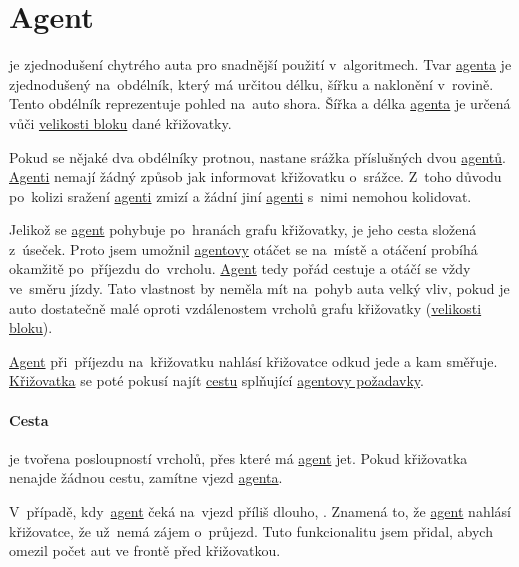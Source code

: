 \section{Agent}\label{sec:agent}



 je zjednodušení chytrého auta pro snadnější použití v~algoritmech.
Tvar \hyperref[sec:agent]{agenta} je zjednodušený na~obdélník, který má určitou délku, šířku a naklonění v~rovině.
Tento obdélník reprezentuje pohled na~auto shora.
Šířka a délka \hyperref[sec:agent]{agenta} je určená vůči \hyperref[par:velikost_bloku]{velikosti bloku} dané křižovatky.

Pokud se nějaké dva obdélníky protnou, nastane srážka příslušných dvou \hyperref[sec:agent]{agentů}.
\hyperref[sec:agent]{Agenti} nemají žádný způsob jak informovat křižovatku o~srážce.
Z~toho důvodu po~kolizi sražení \hyperref[sec:agent]{agenti} zmizí a žádní jiní \hyperref[sec:agent]{agenti} s~nimi nemohou kolidovat.

Jelikož se \hyperref[sec:agent]{agent} pohybuje po~hranách grafu křižovatky, je jeho cesta složená z~úseček.
Proto jsem umožnil \hyperref[sec:agent]{agentovy} otáčet se na~místě a otáčení probíhá okamžitě po~příjezdu do~vrcholu.
\hyperref[sec:agent]{Agent} tedy pořád cestuje a otáčí se vždy ve~směru jízdy.
Tato vlastnost by neměla mít na~pohyb auta velký vliv, pokud je auto dostatečně malé
oproti vzdálenostem vrcholů grafu křižovatky (\hyperref[par:velikost_bloku]{velikosti bloku}).

\hyperref[sec:agent]{Agent} při~příjezdu na~křižovatku nahlásí křižovatce odkud jede a kam směřuje.
\hyperref[sec:krizovatka]{Křižovatka} se poté pokusí najít \hyperref[par:cesta]{cestu} splňující \hyperref[sec:agent]{agentovy požadavky}.

\paragraph{Cesta}\label{par:cesta} je tvořena posloupností vrcholů, přes které má \hyperref[sec:agent]{agent} jet.
Pokud křižovatka nenajde žádnou cestu, zamítne vjezd \hyperref[sec:agent]{agenta}.

V~případě, kdy~\hyperref[sec:agent]{agent} čeká na~vjezd příliš dlouho,
.
Znamená to, že \hyperref[sec:agent]{agent} nahlásí křižovatce, že už~nemá zájem o~průjezd.
Tuto funkcionalitu jsem přidal, abych omezil počet aut ve frontě před křižovatkou.
